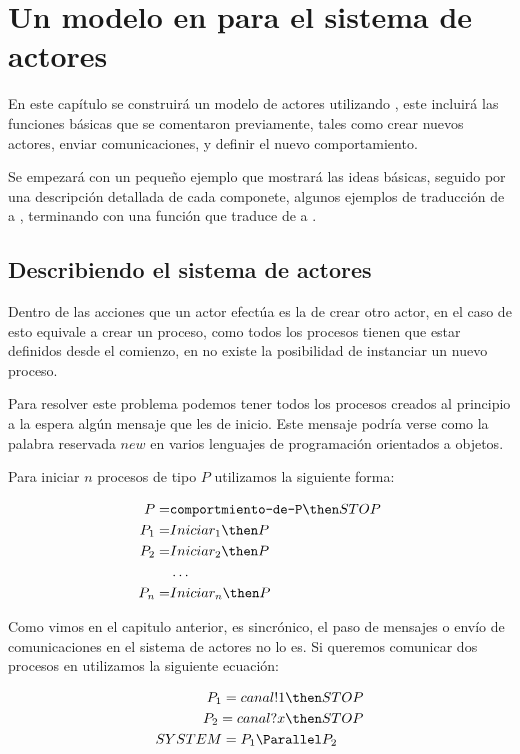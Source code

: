 \chapter{Un modelo en para el sistema de actores}
En este capítulo se construirá un modelo de actores utilizando \CSPm, este incluirá las funciones básicas que se comentaron previamente, tales como crear nuevos actores, enviar comunicaciones, y definir el nuevo comportamiento. 

Se empezará con un pequeño ejemplo que mostrará las ideas básicas, seguido por una descripción detallada de cada componete, algunos ejemplos de traducción de \SAL a \CSPm, terminando con una función que traduce de \SAL a \CSPm.

\section{Describiendo el sistema de actores} 
Dentro de las acciones que un actor efectúa es la de crear otro actor, en el caso de \CSP esto equivale a crear un proceso, como todos los procesos tienen que estar definidos desde el comienzo, en \CSP no existe la posibilidad de instanciar un nuevo proceso.

Para resolver este problema podemos tener todos los procesos creados al principio a la espera algún mensaje que les de inicio. Este mensaje podría verse como la palabra reservada $new$ en varios lenguajes de programación orientados a objetos. 

Para iniciar $n$ procesos de tipo $P$ utilizamos la siguiente forma:

\begin{align*}
P =& \texttt{comportmiento-de-P} \then STOP \\
P_1 =& Iniciar_1 \then P \\
P_2 =& Iniciar_2 \then P \\
&\ldots \\
P_n =& Iniciar_n \then P \\
\end{align*}

Como vimos en el capitulo anterior, \CSP es sincrónico, el paso de mensajes o envío de comunicaciones en el sistema de actores no lo es. Si queremos comunicar dos procesos en \CSP utilizamos la siguiente ecuación:

\begin{align*}
P_1 = canal!1 \then& STOP \\
P_2 = canal?x \then& STOP \\
SYSTEM = P_1 \Parallel& P_2 \\
\end{align*}


